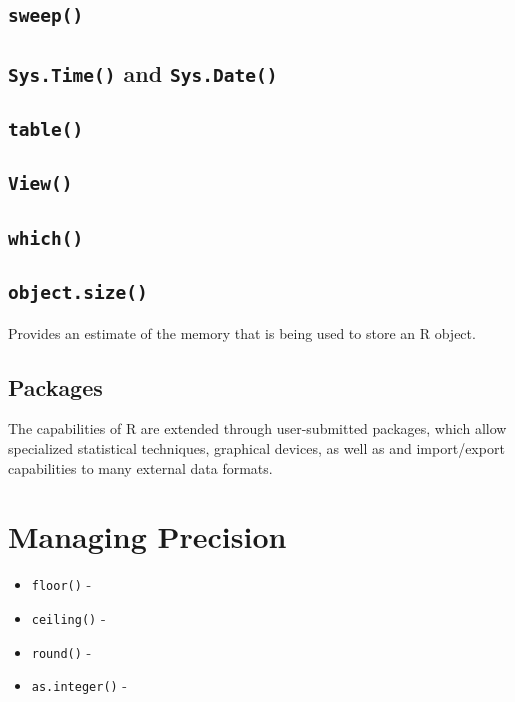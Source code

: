 \subsection{\texttt{sweep()}}
\subsection{\texttt{Sys.Time()} and \texttt{Sys.Date()} }
\subsection{\texttt{table()}}
\subsection{\texttt{View()}}
\subsection{\texttt{which()}}

\subsection{\texttt{object.size()}}
Provides an estimate of the memory that is being used to store an R object.
\newpage


\subsection{Packages}
The capabilities of R are extended through user-submitted packages, which allow specialized statistical techniques, graphical devices, as well as and
import/export capabilities to many external data formats.

\section{Managing Precision}
\begin{itemize}
	\item \texttt{floor()} - 
	\item \texttt{ceiling()} - 
	\item \texttt{round()} - 
	\item \texttt{as.integer()} -
\end{itemize}






